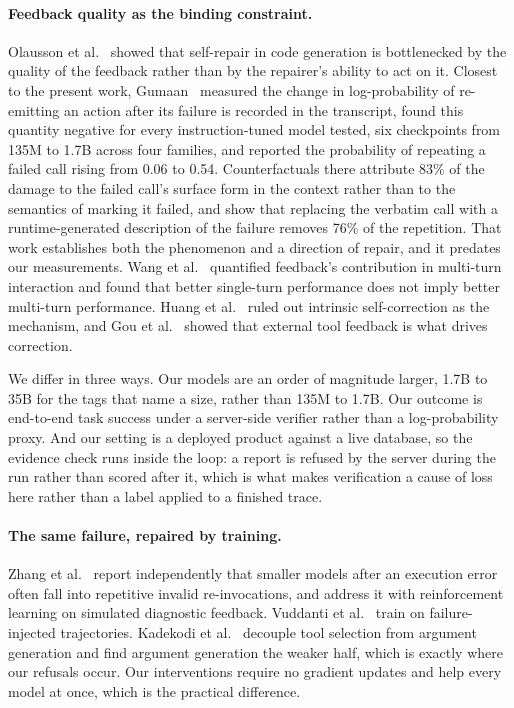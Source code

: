 \documentclass[11pt]{article}
\begin{document}
\paragraph{Feedback quality as the binding constraint.}
Olausson et al.~\cite{olausson2024selfrepair} showed that self-repair in code generation is bottlenecked by the
quality of the feedback rather than by the repairer's ability to act on it. Closest to the present work,
Gumaan~\cite{gumaan2026feedback} measured the change in log-probability of re-emitting an action after its
failure is recorded in the transcript, found this quantity negative for every instruction-tuned model tested,
six checkpoints from 135M to 1.7B across four families, and reported the probability of repeating a failed call
rising from 0.06 to 0.54. Counterfactuals there attribute 83\% of the damage to the failed call's surface form
in the context rather than to the semantics of marking it failed, and show that replacing the verbatim call with
a runtime-generated description of the failure removes 76\% of the repetition. That work establishes both the
phenomenon and a direction of repair, and it predates our measurements. Wang et al.~\cite{wang2024mint}
quantified feedback's contribution in multi-turn interaction and found that better single-turn performance does
not imply better multi-turn performance. Huang et al.~\cite{huang2024selfcorrect} ruled out intrinsic
self-correction as the mechanism, and Gou et al.~\cite{gou2024critic} showed that external tool feedback is what
drives correction.

We differ in three ways. Our models are an order of magnitude larger, 1.7B to 35B for the tags that name a size, rather than 135M to 1.7B. Our
outcome is end-to-end task success under a server-side verifier rather than a log-probability proxy. And our
setting is a deployed product against a live database, so the evidence check runs inside the loop: a report is
refused by the server during the run rather than scored after it, which is what makes verification a cause of
loss here rather than a label applied to a finished trace.

\paragraph{The same failure, repaired by training.}
Zhang et al.~\cite{zhang2026fission} report independently that smaller models after an execution error often
fall into repetitive invalid re-invocations, and address it with reinforcement learning on simulated diagnostic
feedback. Vuddanti et al.~\cite{vuddanti2025paladin} train on failure-injected trajectories. Kadekodi et
al.~\cite{kadekodi2025agentflux} decouple tool selection from argument generation and find argument generation
the weaker half, which is exactly where our refusals occur. Our interventions require no gradient updates and
help every model at once, which is the practical difference.
\end{document}
